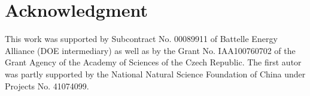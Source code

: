 \documentclass[12pt]{elsarticle}
\begin{document}

\section{Acknowledgment}

This work was supported by Subcontract No. 00089911 of Battelle
Energy Alliance (DOE intermediary) as well as by the
Grant No. IAA100760702 of the Grant Agency of the Academy
of Sciences of the Czech Republic. The first autor was partly
supported by the National Natural Science Foundation
of China under Projects No. 41074099.
\end{document}
